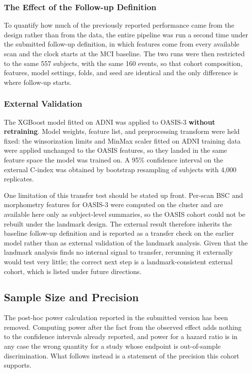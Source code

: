 \documentclass[blue]{ludusofficial}  %
\begin{document}
\subsubsection{The Effect of the Follow-up Definition}
\label{sec:design-methods}

To quantify how much of the previously reported performance came from the design rather than from the data, the entire pipeline was run a second time under the submitted follow-up definition, in which features come from every available scan and the clock starts at the MCI baseline. The two runs were then restricted to the same 557 subjects, with the same 160 events, so that cohort composition, features, model settings, folds, and seed are identical and the only difference is where follow-up starts.

\subsubsection{External Validation}

The XGBoost model fitted on ADNI was applied to OASIS-3 \textbf{without retraining}. Model weights, feature list, and preprocessing transform were held fixed: the winsorization limits and MinMax scaler fitted on ADNI training data were applied unchanged to the OASIS features, so they landed in the same feature space the model was trained on. A 95\% confidence interval on the external C-index was obtained by bootstrap resampling of subjects with 4,000 replicates.

One limitation of this transfer test should be stated up front. Per-scan BSC and morphometry features for OASIS-3 were computed on the cluster and are available here only as subject-level summaries, so the OASIS cohort could not be rebuilt under the landmark design. The external result therefore inherits the baseline follow-up definition and is reported as a transfer check on the earlier model rather than as external validation of the landmark analysis. Given that the landmark analysis finds no internal signal to transfer, rerunning it externally would test very little; the correct next step is a landmark-consistent external cohort, which is listed under future directions.

\subsection{Sample Size and Precision}

The post-hoc power calculation reported in the submitted version has been removed. Computing power after the fact from the observed effect adds nothing to the confidence intervals already reported, and power for a hazard ratio is in any case the wrong quantity for a study whose endpoint is out-of-sample discrimination. What follows instead is a statement of the precision this cohort supports.
\end{document}
